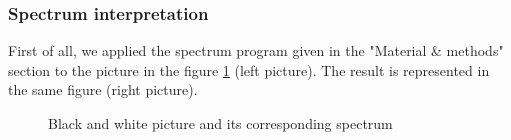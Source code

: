 \documentclass[a4paper]{article}
\begin{document}
		\subsubsection{Spectrum interpretation}
        First of all, we applied the spectrum program given in the "Material \& methods" section to the picture in the figure \ref{wheeleAndSpectrum.pgm} (left picture).   The result is represented in the same figure (right picture).
         \begin{figure}[!htb]\centering
             \begin{minipage}{0.45\textwidth}  \end{minipage}
             \begin{minipage}{0.45\textwidth}  \end{minipage}
             \caption{Black and white picture and its corresponding spectrum}
             \label{wheeleAndSpectrum.pgm}
         \end{figure}
\end{document}
